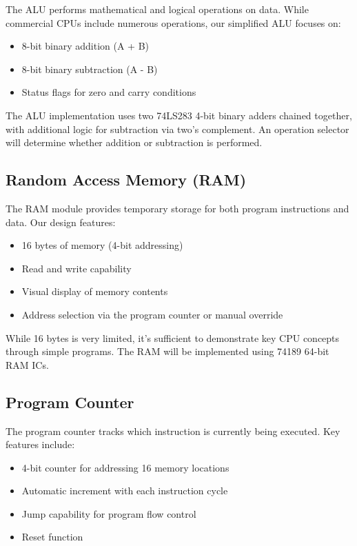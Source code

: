 \documentclass[a4paper,12pt]{article}
\begin{document}
The ALU performs mathematical and logical operations on data. While commercial CPUs include numerous operations, our simplified ALU focuses on:

\begin{itemize}
    \item 8-bit binary addition (A + B)
    \item 8-bit binary subtraction (A - B)
    \item Status flags for zero and carry conditions
\end{itemize}

The ALU implementation uses two 74LS283 4-bit binary adders chained together, with additional logic for subtraction via two's complement. An operation selector will determine whether addition or subtraction is performed.

\subsection{Random Access Memory (RAM)}

The RAM module provides temporary storage for both program instructions and data. Our design features:

\begin{itemize}
    \item 16 bytes of memory (4-bit addressing)
    \item Read and write capability
    \item Visual display of memory contents
    \item Address selection via the program counter or manual override
\end{itemize}

While 16 bytes is very limited, it's sufficient to demonstrate key CPU concepts through simple programs. The RAM will be implemented using 74189 64-bit RAM ICs.

\subsection{Program Counter}

The program counter tracks which instruction is currently being executed. Key features include:

\begin{itemize}
    \item 4-bit counter for addressing 16 memory locations
    \item Automatic increment with each instruction cycle
    \item Jump capability for program flow control
    \item Reset function
\end{itemize}
\end{document}

